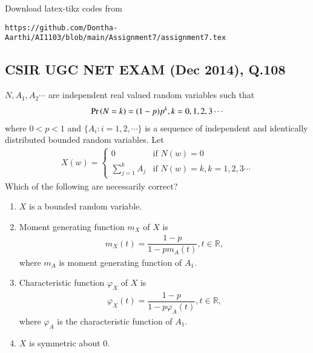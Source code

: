 \documentclass[journal,12pt,twocolumn]{IEEEtran}
\begin{document}
Download latex-tikz codes from 

\begin{lstlisting}
https://github.com/Dontha-Aarthi/AI1103/blob/main/Assignment7/assignment7.tex
\end{lstlisting}
\begin{center}
  \section{\textbf{CSIR UGC NET EXAM (Dec 2014), Q.108}} 
\end{center}
    $N,A_1,A_2\cdots$ are independent real valued random variables such that 
    \begin{align}
        \Pr\left(N=k\right)=(1-p)p^k,k=0,1,2,3\cdots
    \end{align}
    where $0<p<1$ and $\{A_i:i=1,2,\cdots\}$ is a sequence of independent and identically distributed bounded random variables. Let 
    \begin{align}
        X(w) = 
        \begin{cases}
        0  & \text{if } N(w)=0\\
        \sum_{j=1}^{k} A_j & \text{if } N(w)=k,k=1,2,3\cdots 
        \end{cases}
    \end{align}
    Which of the following are necessarily correct?\\
    \begin{enumerate}
        \item $X$ is a bounded random variable. 
        \item Moment generating function $m_X$ of $X$ is
        \begin{align}
            m_X(t)=\dfrac{1-p}{1-pm_A(t)}, t\in \mathbb{R},
        \end{align}
        where $m_A$ is moment generating function of $A_1$.
        \item Characteristic function $\varphi_X$ of $X$ is
        \begin{align}
            \varphi_X(t)=\dfrac{1-p}{1-p\varphi_A(t)},t\in \mathbb{R},
        \end{align}
        where $\varphi_A$ is the characteristic function of $A_1$.
        \item $X$ is symmetric about 0.
    \end{enumerate}
\end{document}
